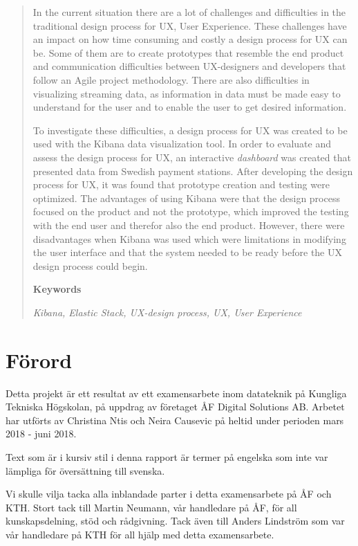 \documentclass[12pt]{kththesis}
\begin{document}
\begin{abstract}

In the current situation there are a lot of challenges and difficulties in the traditional design process for UX, User Experience. These challenges have an impact on how time consuming and costly a design process for UX can be. Some of them are to create prototypes that resemble the end product and communication difficulties between UX-designers and developers that follow an Agile project methodology. There are also difficulties in visualizing streaming data, as information in data must be made easy to understand for the user and to enable the user to get desired information.
 
To investigate these difficulties, a design process for UX was created to be used with the Kibana data visualization tool. In order to evaluate and assess the design process for UX, an interactive \textit{dashboard} was created that presented data from Swedish payment stations. After developing the design process for UX, it was found that prototype creation and testing were optimized. The advantages of using Kibana were that the design process focused on the product and not the prototype, which improved the testing with the end user and therefor also the end product. However, there were disadvantages when Kibana was used which were limitations in modifying the user interface and that the system needed to be ready before the UX design process could begin.


\textbf{Keywords}

\textit{Kibana, Elastic Stack, UX-design process, UX, User Experience}

\end{abstract}

\chapter*{Förord}
Detta projekt är ett resultat av ett examensarbete inom datateknik på Kungliga Tekniska Högskolan, på uppdrag av företaget ÅF Digital Solutions AB. Arbetet har utförts av Christina Ntis och Neira Causevic på heltid under perioden mars 2018 - juni 2018.

Text som är i kursiv stil i denna rapport är termer på engelska som inte var lämpliga för översättning till svenska.

Vi skulle vilja tacka alla inblandade parter i detta examensarbete på ÅF och KTH. Stort tack till Martin Neumann, vår handledare på ÅF, för all kunskapsdelning, stöd och rådgivning. Tack även till Anders Lindström som var vår handledare på KTH för all hjälp med detta examensarbete. 
\end{document}
